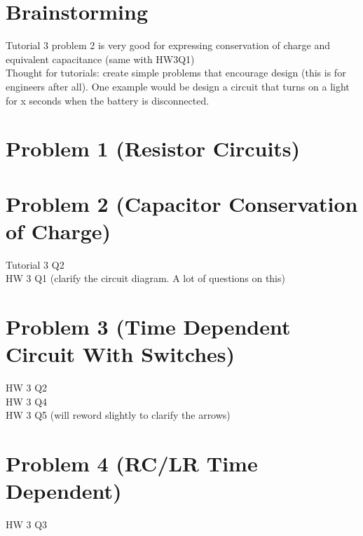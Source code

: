 \documentclass[11pt, fleqn]{article}
\begin{document}
\section*{Brainstorming}
Tutorial 3 problem 2 is very good for expressing conservation of charge and equivalent capacitance (same with HW3Q1)\\
Thought for tutorials: create simple problems that encourage design (this is for engineers after all). One example would be design a circuit that turns on a light for x seconds when the battery is disconnected.


\section*{Problem 1 (Resistor Circuits)}

\section*{Problem 2 (Capacitor Conservation of Charge)}
Tutorial 3 Q2\\
HW 3 Q1 (clarify the circuit diagram. A lot of questions on this)

\section*{Problem 3 (Time Dependent Circuit With Switches)}
HW 3 Q2\\
HW 3 Q4\\
HW 3 Q5 (will reword slightly to clarify the arrows)

\section*{Problem 4 (RC/LR Time Dependent)}
HW 3 Q3
\end{document}
